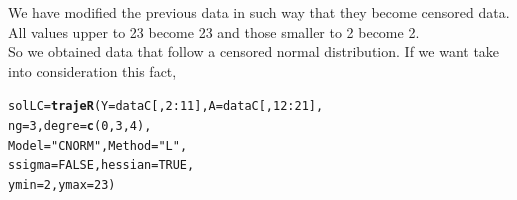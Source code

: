 \documentclass{article}\usepackage[]{graphicx}\usepackage[]{color}
\makeatletter
\newcommand{\hlnum}[1]{\textcolor[rgb]{0.686,0.059,0.569}{#1}}%
\newcommand{\hlstr}[1]{\textcolor[rgb]{0.192,0.494,0.8}{#1}}%
\newcommand{\hlopt}[1]{\textcolor[rgb]{0,0,0}{#1}}%
\newcommand{\hlstd}[1]{\textcolor[rgb]{0.345,0.345,0.345}{#1}}%
\newcommand{\hlkwb}[1]{\textcolor[rgb]{0.69,0.353,0.396}{#1}}%
\newcommand{\hlkwc}[1]{\textcolor[rgb]{0.333,0.667,0.333}{#1}}%
\newcommand{\hlkwd}[1]{\textcolor[rgb]{0.737,0.353,0.396}{\textbf{#1}}}%
\newenvironment{kframe}{%
 \def\at@end@of@kframe{}%
 \ifinner\ifhmode%
  \def\at@end@of@kframe{\end{minipage}}%
  \begin{minipage}{\columnwidth}%
 \fi\fi%
 \def\FrameCommand##1{\hskip\@totalleftmargin \hskip-\fboxsep
 \colorbox{shadecolor}{##1}\hskip-\fboxsep
     \hskip-\linewidth \hskip-\@totalleftmargin \hskip\columnwidth}%
 \MakeFramed {\advance\hsize-\width
   \@totalleftmargin\z@ \linewidth\hsize
   \@setminipage}}%
 {\par\unskip\endMakeFramed%
 \at@end@of@kframe}
\newenvironment{knitrout}{}{} %
\makeatother
\begin{document}
We have modified the previous data in such way that they become censored data. All values upper to 23 become 23 and  those smaller to 2 become 2.\\
So we obtained data that follow a censored normal distribution. If we want take into consideration this fact,
\begin{knitrout}
\color{fgcolor}\begin{kframe}
\begin{alltt}
\hlstd{solLC} \hlkwb{=} \hlkwd{trajeR}\hlstd{(}\hlkwc{Y} \hlstd{= dataC[,}\hlnum{2}\hlopt{:}\hlnum{11}\hlstd{],} \hlkwc{A} \hlstd{= dataC[,}\hlnum{12}\hlopt{:}\hlnum{21}\hlstd{],}
               \hlkwc{ng} \hlstd{=} \hlnum{3}\hlstd{,} \hlkwc{degre} \hlstd{=} \hlkwd{c}\hlstd{(}\hlnum{0}\hlstd{,}\hlnum{3}\hlstd{,}\hlnum{4}\hlstd{),}
               \hlkwc{Model}\hlstd{=}\hlstr{"CNORM"}\hlstd{,} \hlkwc{Method} \hlstd{=} \hlstr{"L"}\hlstd{,}
               \hlkwc{ssigma} \hlstd{=} \hlnum{FALSE}\hlstd{,} \hlkwc{hessian} \hlstd{=} \hlnum{TRUE}\hlstd{,}
               \hlkwc{ymin}\hlstd{=}\hlnum{2}\hlstd{,} \hlkwc{ymax}\hlstd{=}\hlnum{23}\hlstd{)}
\end{alltt}
\end{kframe}
\end{knitrout}
\end{document}
